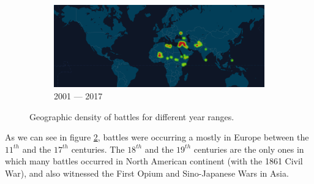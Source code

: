 \begin{figure}[!t]
\begin{subfigure}[b]{0.495\linewidth}
		\centering 
		\includegraphics[width=\linewidth]{figures/2000-2018.png}
		\caption[]%
		{{\small 2001 --- 2017 }}    
		\label{fig:geodens_2000-2017}
	\end{subfigure}
	\baselineskip
	\caption{\small Geographic density of battles for different year ranges.} 
	\label{fig:geodens}
\end{figure}

As we can see in figure \ref{fig:geodens}, battles were occurring a mostly in Europe between the $11^{th}$ and the $17^{th}$ centuries. The $18^{th}$ and the $19^{th}$ centuries are the only ones in which many battles occurred in North American continent (with the 1861 Civil War), and also witnessed the First Opium and Sino-Japanese Wars in Asia. 